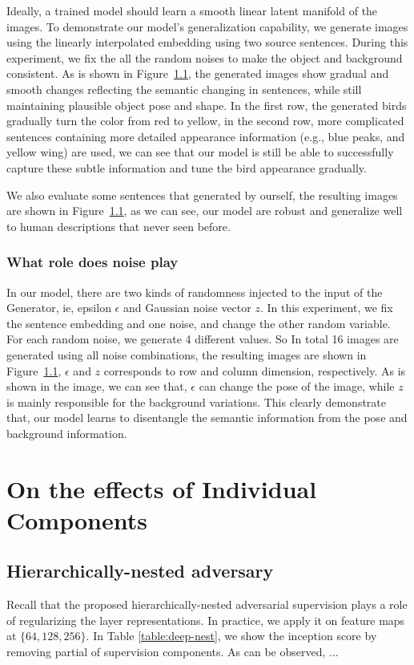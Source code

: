 \documentclass[10pt,twocolumn,letterpaper]{article}
\begin{document}
Ideally, a trained model should learn a smooth linear latent manifold of the images. To demonstrate our model's generalization capability, we generate images using the linearly interpolated  embedding using two source sentences. During this experiment, we fix the all the random noises to make the object and background consistent. As is shown in Figure~\ref{}, the generated images show gradual and smooth changes reflecting the semantic changing in sentences, while still maintaining plausible object pose and shape. In the first row, the generated birds gradually turn the color from red to yellow, in the second row, more complicated sentences containing more detailed appearance information (e.g., blue peaks, and yellow wing) are used, we can see that our model is still be able to successfully capture these subtle information and tune the bird appearance gradually. 

We also evaluate some sentences that generated by ourself, the resulting images are shown in Figure~\ref{}, as we can see, our model are robust and generalize well to human descriptions that never seen before. 


\subsubsection{What role does noise play}
In our model, there are two kinds of randomness injected to the input of the Generator, ie, epsilon $\epsilon$ and Gaussian noise vector $z$.
In this experiment, we fix the sentence embedding and one noise, and change the other random variable. For each random noise, we generate 4 different values. So In total 16 images are generated using all noise combinations, the resulting images are shown in Figure~\ref{}, $\epsilon$ and $z$ corresponds to row and column dimension, respectively. As is shown in the image, we can see that, $\epsilon$ can change the pose of the image, while $z$ is mainly responsible for the background variations. This clearly demonstrate that, our model learns to disentangle the semantic information from the pose and background information.

\section{On the effects of Individual Components}
\subsection{Hierarchically-nested adversary}
Recall that the proposed hierarchically-nested adversarial supervision plays a role of regularizing the layer representations. In practice, we apply it on feature maps at $\{64, 128, 256\}$. In Table \ref{table:deep-nest}, we show the inception score by removing partial of supervision components. As can be observed, ...
\end{document}
